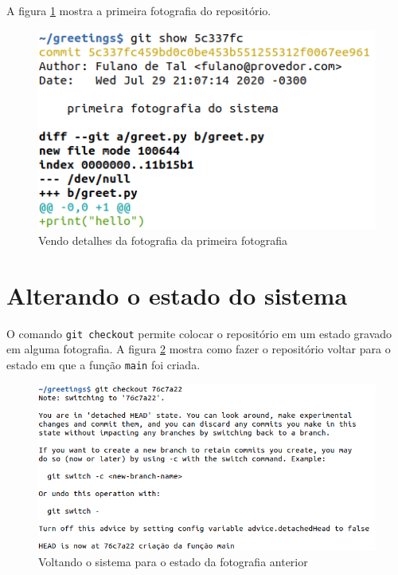 \documentclass[a4paper]{book}
\begin{document}
A figura \ref{fig:17} mostra a primeira fotografia do repositório.

\begin{figure}[ht]
\caption{Vendo detalhes da fotografia da primeira fotografia}
\label{fig:17}
\centering
\includegraphics[scale=0.6,left]{"images/17-Vendo detalhes da fotografia da primeira fotografia.png"}
\end{figure}

\newpage
\section{Alterando o estado do sistema}

O comando \texttt{git checkout} permite colocar o repositório
em um estado gravado em alguma fotografia. 
A figura \ref{fig:18} mostra como fazer o repositório
voltar para o estado em que a função \texttt{main}
foi criada.

\begin{figure}[ht]
\caption{Voltando o sistema para o estado da fotografia anterior}
\label{fig:18}
\centering
\includegraphics[scale=0.6,left]{"images/18-Voltando o sistema para o estado da fotografia anterior.png"}
\end{figure}
\end{document}
